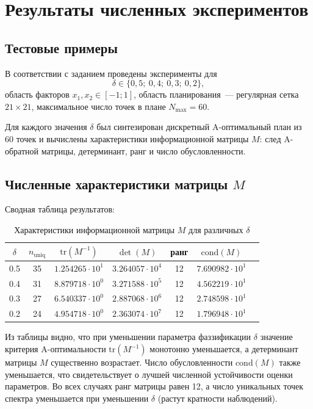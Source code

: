\documentclass[a4paper,12pt]{article}
\begin{document}

\section{Результаты численных экспериментов}

\subsection{Тестовые примеры}

В соответствии с заданием проведены эксперименты для
\[
\delta \in \{0{,}5;\ 0{,}4;\ 0{,}3;\ 0{,}2\},
\]
область факторов $x_1,x_2 \in [-1;1]$,
область планирования~--- регулярная сетка $21\times 21$,
максимальное число точек в плане $N_{\max} = 60$.

Для каждого значения $\delta$ был синтезирован дискретный
A-оптимальный план из 60 точек и вычислены характеристики
информационной матрицы $M$:
след A-обратной матрицы, детерминант, ранг и число обусловленности.

\subsection{Численные характеристики матрицы $M$}

Сводная таблица результатов:

\begin{table}[h!]
\centering
\caption{Характеристики информационной матрицы $M$ для различных $\delta$}
\begin{tabular}{ccccccc}
\toprule
$\delta$ &
$n_{\text{uniq}}$ &
$\mathrm{tr}(M^{-1})$ &
$\det(M)$ &
\rule{0pt}{2.4ex}ранг &
$\mathrm{cond}(M)$ \\
\midrule
0.5 & 35 & $1.254265 \cdot 10^{1}$ & $3.264057 \cdot 10^{4}$ &
12 & $7.690982 \cdot 10^{1}$ \\
0.4 & 31 & $8.879718 \cdot 10^{0}$ & $3.271588 \cdot 10^{5}$ &
12 & $4.562219 \cdot 10^{1}$ \\
0.3 & 27 & $6.540337 \cdot 10^{0}$ & $2.887068 \cdot 10^{6}$ &
12 & $2.748598 \cdot 10^{1}$ \\
0.2 & 24 & $4.954718 \cdot 10^{0}$ & $2.363074 \cdot 10^{7}$ &
12 & $1.796948 \cdot 10^{1}$ \\
\bottomrule
\end{tabular}
\end{table}

Из таблицы видно, что при уменьшении параметра фаззификации $\delta$
значение критерия A-оптимальности $\mathrm{tr}(M^{-1})$ монотонно
уменьшается, а детерминант матрицы $M$ существенно возрастает.
Число обусловленности $ \mathrm{cond}(M)$ также уменьшается,
что свидетельствует о лучшей численной устойчивости оценки параметров.
Во всех случаях ранг матрицы равен 12, а число уникальных точек спектра
уменьшается при уменьшении $\delta$ (растут кратности наблюдений).
\end{document}
